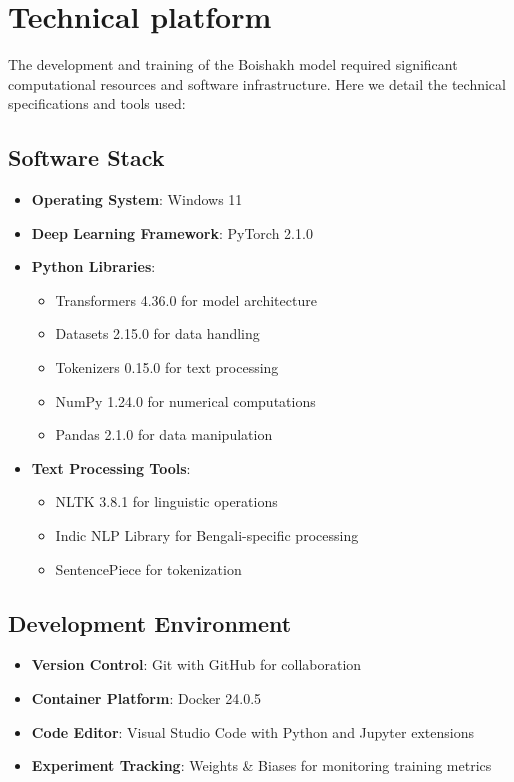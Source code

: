\section{Technical platform}
The development and training of the Boishakh model required significant computational resources and software infrastructure. Here we detail the technical specifications and tools used:


\subsection{Software Stack}
\begin{itemize}
    \item \textbf{Operating System}: Windows 11
    \item \textbf{Deep Learning Framework}: PyTorch 2.1.0
    \item \textbf{Python Libraries}:
    \begin{itemize}
        \item Transformers 4.36.0 for model architecture
        \item Datasets 2.15.0 for data handling
        \item Tokenizers 0.15.0 for text processing
        \item NumPy 1.24.0 for numerical computations
        \item Pandas 2.1.0 for data manipulation
    \end{itemize}
    \item \textbf{Text Processing Tools}:
    \begin{itemize}
        \item NLTK 3.8.1 for linguistic operations
        \item Indic NLP Library for Bengali-specific processing
        \item SentencePiece for tokenization
    \end{itemize}
\end{itemize}

\subsection{Development Environment}
\begin{itemize}
    \item \textbf{Version Control}: Git with GitHub for collaboration
    \item \textbf{Container Platform}: Docker 24.0.5
    \item \textbf{Code Editor}: Visual Studio Code with Python and Jupyter extensions
    \item \textbf{Experiment Tracking}: Weights \& Biases for monitoring training metrics
\end{itemize}

